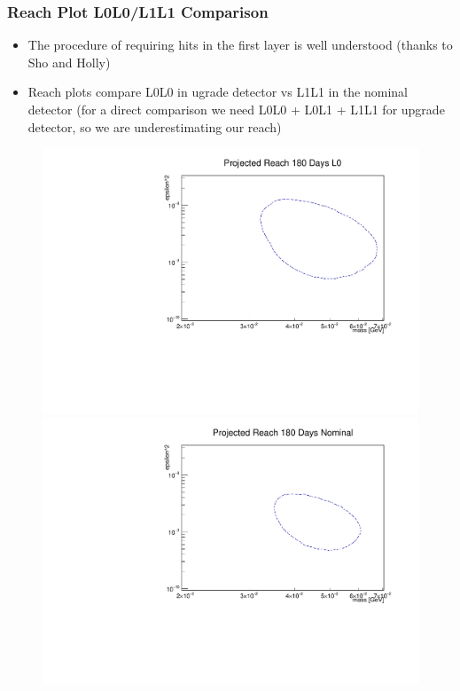 \documentclass{beamer}
\begin{document}
\begin{frame}
\frametitle{Reach Plot L0L0/L1L1 Comparison}
\begin{itemize}
\item The procedure of requiring hits in the first layer is well understood (thanks to Sho and Holly)
\item Reach plots compare L0L0 in ugrade detector vs L1L1 in the nominal detector (for a direct comparison we need L0L0 + L0L1 + L1L1 for upgrade detector, so we are underestimating our reach)
\end{itemize}
\begin{figure}
\includegraphics[width=0.4\linewidth]{figs/L0_180_days_loose.pdf}
\includegraphics[width=0.4\linewidth]{figs/nom_180_days_loose.pdf}
\end{figure}

\end{frame}

\end{document}
